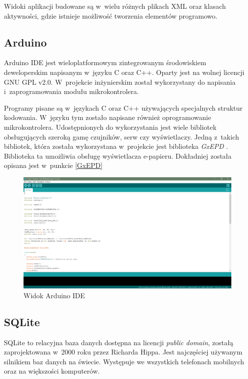 \documentclass[a4paper,12pt, twoside]{article}
\begin{document}
    	Widoki aplikacji budowane są w~wielu różnych plikach XML oraz klasach aktywności, gdzie istnieje możliwość tworzenia elementów programowo.
    	
    	\subsection{Arduino}
    	Arduino IDE jest wieloplatformowym zintegrowanym środowiskiem deweloperskim napisanym w~języku C oraz C++. Oparty jest na wolnej licencji GNU GPL v2.0. W~projekcie inżynierskim został wykorzystany do napisania i~zaprogramowania modułu mikrokontrolera.
    	
    	Programy pisane są w~językach C oraz C++ używających specjalnych struktur kodowania. W~języku tym zostało napisane również oprogramowanie mikrokontrolera. Udostępnionych do wykorzystania jest wiele bibliotek obsługujących szeroką gamę czujników, serw czy wyświetlaczy. Jedną z~takich bibliotek, która została wykorzystana w~projekcie jest biblioteka \textit{GxEPD} \cite{gxepd}. Biblioteka ta umożliwia obsługę wyświetlacza e-papieru. Dokładniej została opisana jest w~punkcie \ref{GxEPD}
    	
    	\begin{figure}[H]
    			\includegraphics[width=1\textwidth]{images/rys3_arduino.png}
    			\caption{Widok Arduino IDE}
                \label{fig:arduinoide}
    	\end{figure}
    	
    	\subsection{SQLite}
    	SQLite to relacyjna baza danych dostępna na licencji \textit{public domain}\cite{publicdomain}, zostałą zaprojektowana w~2000 roku przez Richarda Hippa. Jest najczęściej używanym silnikiem baz danych na świecie. Występuje we wszystkich telefonach mobilnych oraz na większości komputerów. 
    	
\end{document}
